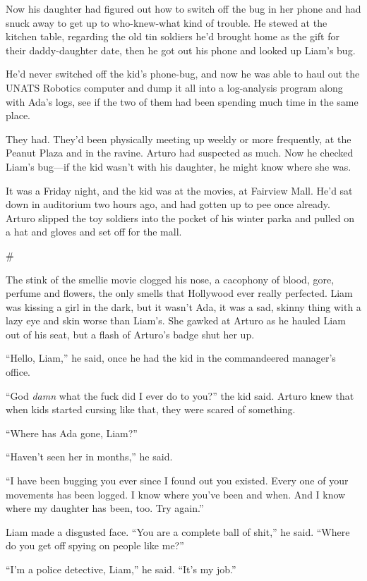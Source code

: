 Now his daughter had figured out how to switch off the bug in her
phone and had snuck away to get up to who-knew-what kind of
trouble. He stewed at the kitchen table, regarding the old tin
soldiers he’d brought home as the gift for their daddy-daughter
date, then he got out his phone and looked up Liam’s bug.

He’d never switched off the kid’s phone-bug, and now he was able to
haul out the UNATS Robotics computer and dump it all into a
log-analysis program along with Ada’s logs, see if the two of them
had been spending much time in the same place.

They had. They’d been physically meeting up weekly or more
frequently, at the Peanut Plaza and in the ravine. Arturo had
suspected as much. Now he checked Liam’s bug—if the kid wasn’t with
his daughter, he might know where she was.

It was a Friday night, and the kid was at the movies, at Fairview
Mall. He’d sat down in auditorium two hours ago, and had gotten up
to pee once already. Arturo slipped the toy soldiers into the
pocket of his winter parka and pulled on a hat and gloves and set
off for the mall.

\#

The stink of the smellie movie clogged his nose, a cacophony of
blood, gore, perfume and flowers, the only smells that Hollywood
ever really perfected. Liam was kissing a girl in the dark, but it
wasn’t Ada, it was a sad, skinny thing with a lazy eye and skin
worse than Liam’s. She gawked at Arturo as he hauled Liam out of
his seat, but a flash of Arturo’s badge shut her up.

“Hello, Liam,” he said, once he had the kid in the commandeered
manager’s office.

“God \emph{damn} what the fuck did I ever do to you?” the kid said.
Arturo knew that when kids started cursing like that, they were
scared of something.

“Where has Ada gone, Liam?”

“Haven’t seen her in months,” he said.

“I have been bugging you ever since I found out you existed. Every
one of your movements has been logged. I know where you’ve been and
when. And I know where my daughter has been, too. Try again.”

Liam made a disgusted face. “You are a complete ball of shit,” he
said. “Where do you get off spying on people like me?”

“I’m a police detective, Liam,” he said. “It’s my job.”

